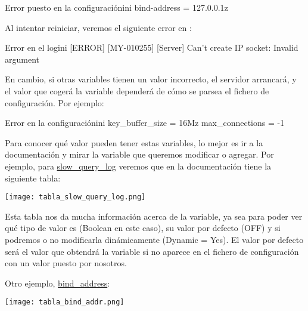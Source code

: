 \begin{mycode}{Error puesto en la configuración}{ini}{}
bind-address            = 127.0.0.1z
\end{mycode}

Al intentar reiniciar, veremos el siguiente error en :

\begin{mycode}{Error en el log}{ini}{}
[ERROR] [MY-010255] [Server] Can't create IP socket: Invalid argument
\end{mycode}

En cambio, si otras variables tienen un valor incorrecto, el servidor arrancará, y el valor que cogerá la variable dependerá de cómo se parsea el fichero de configuración. Por ejemplo:

\begin{mycode}{Error en la configuración}{ini}{}
key_buffer_size            = 16Mz
max_connections            = -1
\end{mycode}

Para conocer qué valor pueden tener estas variables, lo mejor es ir a la documentación y mirar la variable que queremos modificar o agregar.  Por ejemplo, para \href{https://dev.mysql.com/doc/refman/8.0/en/server-system-variables.html#sysvar_slow_query_log}{slow\_query\_log} veremos que en la documentación tiene la siguiente tabla:

\begin{center}
    \vspace{-10pt}
    \texttt{[image: tabla\_slow\_query\_log.png]}
    \vspace{-20pt}
\end{center}

Esta tabla nos da mucha información acerca de la variable, ya sea para poder ver qué tipo de valor es (Boolean en este caso), su valor por defecto (OFF) y si podremos o no modificarla dinámicamente (Dynamic = Yes). El valor por defecto será el valor que obtendrá la variable si no aparece en el fichero de configuración con un valor puesto por nosotros.

Otro ejemplo, \href{https://dev.mysql.com/doc/refman/8.0/en/server-system-variables.html#sysvar_bind_address}{bind\_address}:

\begin{center}
    \vspace{-10pt}
    \texttt{[image: tabla\_bind\_addr.png]}
    \vspace{-20pt}
\end{center}


